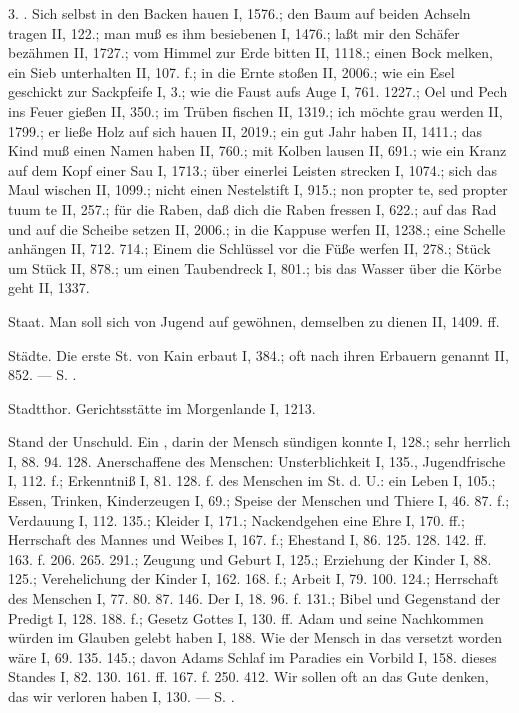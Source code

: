 3. . Sich selbst in den Backen hauen I, 1576.; den Baum auf beiden Achseln tragen II, 122.; man muß es ihm besiebenen I, 1476.; laßt mir den Schäfer bezähmen II, 1727.; vom Himmel zur Erde bitten II, 1118.; einen Bock melken, ein Sieb unterhalten II, 107. f.; in die Ernte stoßen II, 2006.; wie ein Esel geschickt zur Sackpfeife I, 3.; wie die Faust aufs Auge I, 761. 1227.; Oel und Pech ins Feuer gießen II, 350.; im Trüben fischen II, 1319.; ich möchte grau werden II, 1799.; er ließe Holz auf sich hauen II, 2019.; ein gut Jahr haben II, 1411.; das Kind muß einen Namen haben II, 760.; mit Kolben lausen II, 691.; wie ein Kranz auf dem Kopf einer Sau I, 1713.; über einerlei Leisten strecken I, 1074.; sich das Maul wischen II, 1099.; nicht einen Nestelstift I, 915.; non propter te, sed propter tuum te II, 257.; für die Raben, daß dich die Raben fressen I, 622.; auf das Rad und auf die Scheibe setzen II, 2006.; in die Kappuse werfen II, 1238.; eine Schelle anhängen II, 712. 714.; Einem die Schlüssel vor die Füße werfen II, 278.; Stück um Stück II, 878.; um einen Taubendreck I, 801.; bis das Wasser über die Körbe geht II, 1337.

Staat. Man soll sich von Jugend auf gewöhnen, demselben zu dienen II, 1409. ff.

Städte. Die erste St. von Kain erbaut I, 384.; oft nach ihren Erbauern genannt II, 852. — S. .

Stadtthor. Gerichtsstätte im Morgenlande I, 1213.

Stand der Unschuld. Ein , darin der Mensch sündigen konnte I, 128.; sehr herrlich I, 88. 94. 128. Anerschaffene  des Menschen: Unsterblichkeit I, 135., Jugendfrische I, 112. f.; Erkenntniß I, 81. 128. f.  des Menschen im St. d. U.: ein  Leben I, 105.; Essen, Trinken, Kinderzeugen I, 69.; Speise der Menschen und Thiere I, 46. 87. f.; Verdauung I, 112. 135.; Kleider I, 171.; Nackendgehen eine Ehre I, 170. ff.; Herrschaft des Mannes und Weibes I, 167. f.; Ehestand I, 86. 125. 128. 142. ff. 163. f. 206. 265. 291.; Zeugung und Geburt I, 125.; Erziehung der Kinder I, 88. 125.; Verehelichung der Kinder I, 162. 168. f.; Arbeit I, 79. 100. 124.; Herrschaft des Menschen I, 77. 80. 87. 146. Der  I, 18. 96. f. 131.; Bibel und Gegenstand der Predigt I, 128. 188. f.; Gesetz Gottes I, 130. ff. Adam und seine Nachkommen würden im Glauben gelebt haben I, 188. Wie der Mensch in das  versetzt worden wäre I, 69. 135. 145.; davon Adams Schlaf im Paradies ein Vorbild I, 158.  dieses Standes I, 82. 130. 161. ff. 167. f. 250. 412. Wir sollen oft an das Gute denken, das wir verloren haben I, 130. — S. .

